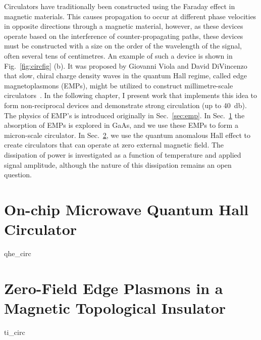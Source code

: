 Circulators have traditionally been constructed using the Faraday effect in magnetic materials. This causes propagation to occur at different phase
velocities in opposite directions through a magnetic material, however, as these devices operate based on the interference of counter-propagating paths,
these devices must be constructed with a size on the order of the wavelength of the signal, often several tens of centimetres. An example of such a device is
shown in Fig.~\ref{fig:circfig} (b). It was proposed by
Giovanni Viola and David DiVincenzo that slow, chiral charge density waves in the quantum Hall regime, called edge magnetoplasmons (EMPs), might be utilized to
construct millimetre-scale circulators~\cite{PhysRevX.4.021019}. In the following chapter, I present work that implements this idea to form non-reciprocal
devices and demonstrate strong circulation (up to \SI{40}{\decibel}). The physics of EMP's is introduced originally in Sec.~\ref{sec:emp}. In Sec.~\ref{sec:hallcirc} the
absorption of EMPs is explored in GaAs, and we use these EMPs to form a micron-scale circulator. In Sec.~\ref{sec:spinhallcirc}, we use the quantum anomalous Hall
effect to create circulators that can operate at zero external magnetic field. The dissipation of power is investigated as a function of temperature and applied signal
amplitude, although the nature of this dissipation remains an open question.

\clearpage
\section{On-chip Microwave Quantum Hall Circulator}
\label{sec:hallcirc}
{qhe_circ}

\clearpage
\section{Zero-Field Edge Plasmons in a Magnetic Topological Insulator}
\label{sec:spinhallcirc}
{ti_circ}
